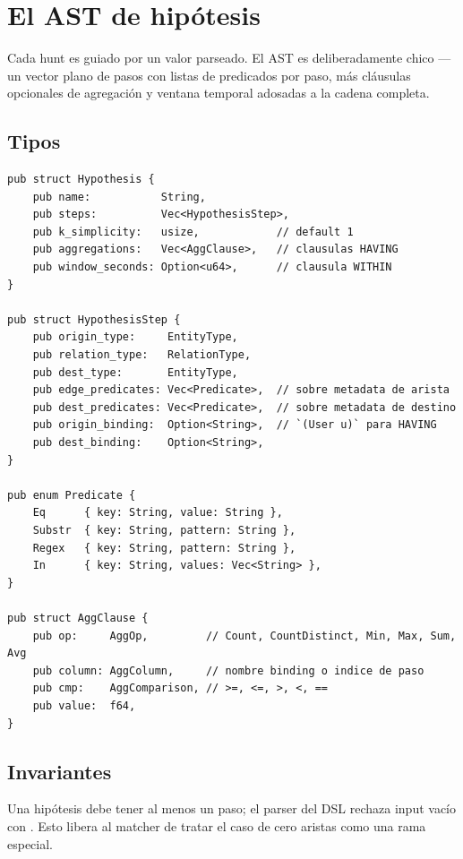 \chapter{El AST de hipótesis}
\label{ch:hypothesis}

Cada hunt es guiado por un valor  parseado. El
AST es deliberadamente chico --- un vector plano de pasos con
listas de predicados por paso, más cláusulas opcionales de
agregación y ventana temporal adosadas a la cadena completa.

\section{Tipos}

\begin{lstlisting}[style=rust]
pub struct Hypothesis {
    pub name:           String,
    pub steps:          Vec<HypothesisStep>,
    pub k_simplicity:   usize,            // default 1
    pub aggregations:   Vec<AggClause>,   // clausulas HAVING
    pub window_seconds: Option<u64>,      // clausula WITHIN
}

pub struct HypothesisStep {
    pub origin_type:     EntityType,
    pub relation_type:   RelationType,
    pub dest_type:       EntityType,
    pub edge_predicates: Vec<Predicate>,  // sobre metadata de arista
    pub dest_predicates: Vec<Predicate>,  // sobre metadata de destino
    pub origin_binding:  Option<String>,  // `(User u)` para HAVING
    pub dest_binding:    Option<String>,
}

pub enum Predicate {
    Eq      { key: String, value: String },
    Substr  { key: String, pattern: String },
    Regex   { key: String, pattern: String },
    In      { key: String, values: Vec<String> },
}

pub struct AggClause {
    pub op:     AggOp,         // Count, CountDistinct, Min, Max, Sum, Avg
    pub column: AggColumn,     // nombre binding o indice de paso
    pub cmp:    AggComparison, // >=, <=, >, <, ==
    pub value:  f64,
}
\end{lstlisting}

\section{Invariantes}

\begin{invariant}
Una hipótesis debe tener al menos un paso; el parser del DSL
rechaza input vacío con . Esto
libera al matcher de tratar el caso de cero aristas como una rama
especial.
\end{invariant}


